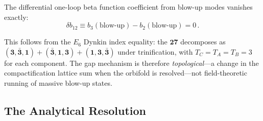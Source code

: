 \begin{theorem}
\label{thm:4-blowup}
The differential one-loop beta function coefficient from blow-up modes vanishes exactly:
\begin{equation}
  \delta b_{12} \equiv b_3(\text{blow-up}) - b_2(\text{blow-up}) = 0\,.
  \label{eq:4-deltab12}
\end{equation}
\end{theorem}

This follows from the $E_6$ Dynkin index equality: the $\mathbf{27}$ decomposes as $(\mathbf{3},\bar{\mathbf{3}},\mathbf{1}) + (\bar{\mathbf{3}},\mathbf{1},\mathbf{3}) + (\mathbf{1},\mathbf{3},\bar{\mathbf{3}})$ under trinification, with $T_C = T_A = T_B = 3$ for each component.  The gap mechanism is therefore \emph{topological}---a change in the compactification lattice sum when the orbifold is resolved---not field-theoretic running of massive blow-up states.


\subsection{The Analytical Resolution}
\label{sec:4-gap-analytical}

